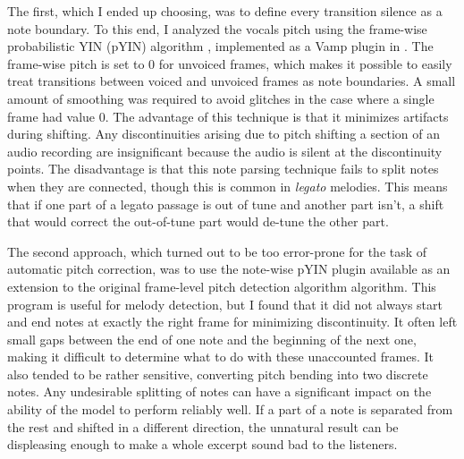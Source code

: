 The first, which I ended up choosing, was to define every transition silence as a note boundary. To this end, I analyzed the vocals pitch using the frame-wise probabilistic YIN (pYIN) algorithm \cite{mauch2014pyin}, implemented as a Vamp plugin in \cite{cannam2010sonic}. The frame-wise pitch is set to 0 for unvoiced frames, which makes it possible to easily treat transitions between voiced and unvoiced frames as note boundaries. A small amount of smoothing was required to avoid glitches in the case where a single frame had value 0. The advantage of this technique is that it minimizes artifacts during shifting. Any discontinuities arising due to pitch shifting a section of an audio recording are insignificant because the audio is silent at the discontinuity points. The disadvantage is that this note parsing technique fails to split notes when they are connected, though this is common in \textit{legato} melodies. This means that if one part of a legato passage is out of tune and another part isn't, a shift that would correct the out-of-tune part would de-tune the other part.

The second approach, which turned out to be too error-prone for the task of automatic pitch correction, was to use the note-wise pYIN plugin available as an extension to the original frame-level pitch detection algorithm algorithm. This program is useful for melody detection, but I found that it did not always start and end notes at exactly the right frame for minimizing discontinuity. It often left small gaps between the end of one note and the beginning of the next one, making it difficult to determine what to do with these unaccounted frames. It also tended to be rather sensitive, converting pitch bending into two discrete notes. Any undesirable splitting of notes can have a significant impact on the ability of the model to perform reliably well. If a part of a note is separated from the rest and shifted in a different direction, the unnatural result can be displeasing enough to make a whole excerpt sound bad to the listeners.

